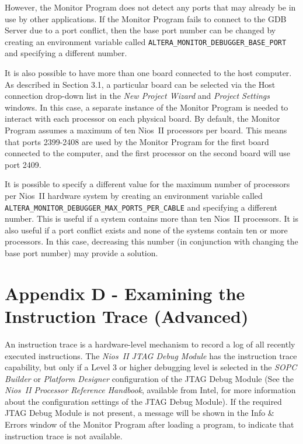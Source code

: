 \documentclass[11pt, twoside, pdftex]{article}
\begin{document}
However, the Monitor Program does not detect any ports that may
already be in use by other applications. If the Monitor Program
fails to connect to the GDB Server due to a port conflict, then
the base port number can be changed by creating an environment
variable called \texttt{ALTERA\_MONITOR\_DEBUGGER\_BASE\_PORT}
and specifying a different number.

It is also possible to have more than one board connected to
the host computer. As described in Section 3.1, a particular
board can be selected via the \textsf{Host connection} drop-down
list in the {\it New Project Wizard} and {\it Project Settings}
windows. In this case, a separate instance of the Monitor
Program is needed to interact with each processor on each
physical board. By default, the Monitor Program assumes a
maximum of ten Nios~II processors per board. This means that
ports 2399-2408 are used by the Monitor Program for the first
board connected to the computer, and the first processor on the
second board will use port 2409.

It is possible to specify a different value for the maximum
number of processors per Nios~II hardware system by creating an
environment variable called 
\texttt{ALTERA\_MONITOR\_DEBUGGER\_MAX\_PORTS\_PER\_CABLE} and
specifying a different number. 
This is useful if a system contains more than ten Nios~II
processors. It is also useful if a port conflict exists and none
of the systems contain ten or more processors. In this case,
decreasing this number (in conjunction with changing the base
port number) may provide a solution.


\newpage
\section{Appendix D - Examining the Instruction Trace (Advanced)}

An instruction trace is a hardware-level mechanism to record a
log of all recently executed instructions. 
The \emph{Nios~II JTAG Debug Module} has the instruction trace
capability, but only if a Level 3 or higher debugging level
is selected in the \emph{SOPC Builder} or \emph{Platform Designer}
configuration of the JTAG Debug Module 
(See the \emph{Nios~II Processor Reference Handbook},
available from Intel, for more information about the
configuration settings of the JTAG Debug Module). If the 
required JTAG Debug Module is not present, a message will be
shown in the \textsf{Info \& Errors} window of the Monitor
Program after loading a program, to indicate that instruction
trace is not available.
\end{document}
